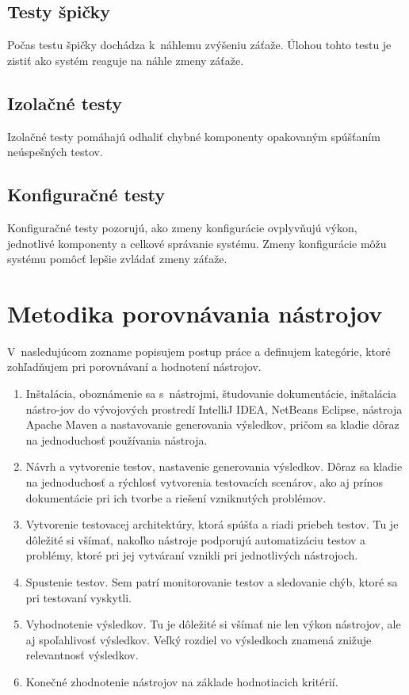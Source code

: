 \documentclass[12pt,oneside,final]{fithesis-utf8}
\begin{document}
\section{Testy špičky}
Počas testu špičky dochádza k~náhlemu zvýšeniu záťaže. Úlohou tohto testu je zistiť ako systém reaguje na náhle zmeny záťaže.

\section{Izolačné testy}
Izolačné testy pomáhajú odhaliť chybné komponenty opakovaným spúšťaním neúspešných testov.

\section{Konfiguračné testy}
Konfiguračné testy pozorujú, ako zmeny konfigurácie ovplyvňujú výkon, jednotlivé komponenty a celkové správanie systému. Zmeny konfigurácie môžu systému pomôcť lepšie zvládať zmeny záťaže\cite{IntegratedApproach}.



\chapter{Metodika porovnávania nástrojov}

V~nasledujúcom zozname popisujem postup práce a definujem kategórie, ktoré zohľadňujem pri porovnávaní a hodnotení nástrojov.

\begin{enumerate}

\item Inštalácia, oboznámenie sa s~nástrojmi, študovanie dokumentácie, inštalácia nástro-jov do vývojových prostredí IntelliJ IDEA, NetBeans Eclipse, nástroja Apache Maven a nastavovanie generovania výsledkov, pričom sa kladie dôraz na jednoduchosť používania nástroja.

\item Návrh a vytvorenie testov, nastavenie generovania výsledkov. Dôraz sa kladie na jednoduchosť a rýchlosť vytvorenia testovacích scenárov, ako aj prínos dokumentácie pri ich tvorbe a riešení vzniknutých problémov.

\item Vytvorenie testovacej architektúry, ktorá spúšťa a riadi priebeh testov. Tu je dôležité si všímať, nakoľko nástroje podporujú automatizáciu testov a problémy, ktoré pri jej vytváraní vznikli pri jednotlivých nástrojoch.

\item Spustenie testov. Sem patrí monitorovanie testov a sledovanie chýb, ktoré sa pri testovaní vyskytli. 

\item Vyhodnotenie výsledkov. Tu je dôležité si všímať nie len výkon nástrojov, ale aj spoľahlivosť výsledkov. Veľký rozdiel vo výsledkoch znamená znižuje relevantnosť výsledkov.

\item Konečné zhodnotenie nástrojov na základe hodnotiacich kritérií.

\end{enumerate}
\end{document}

